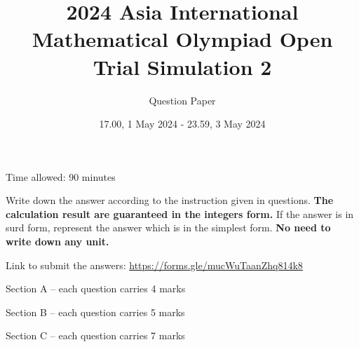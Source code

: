\documentclass[11pt]{scrartcl}
\title{2024 Asia International Mathematical Olympiad Open Trial Simulation 2}
\author{Question Paper}
\date{17.00, 1 May 2024 - 23.59, 3 May 2024}
\begin{document}
\maketitle
\begin{center}
    \Huge
\end{center}
\vspace{3cm}

\begin{flushright}
    \huge
   Time allowed: 90 minutes
\end{flushright}

\vspace{3cm}
\normalsize
Write down the answer according to the instruction given in questions. \textbf{The calculation result are guaranteed in the integers form.} If the answer is in surd form, represent the answer which is in the simplest form. \textbf{No need to write down any unit.}

\vspace{2cm}
Link to submit the answers: \url{https://forms.gle/mucWuTaanZhq814k8}

\pagestyle{plain}
\newpage
Section A – each question carries 4 marks

\hrulefill %
\begin{enumerate}

\end{enumerate}


\newpage
Section B – each question carries 5 marks

\hrulefill %
\begin{enumerate}[resume]
    
\end{enumerate}

\newpage
Section C – each question carries 7 marks

\hrulefill %
\begin{enumerate}[resume]

\end{enumerate}
\end{document}
